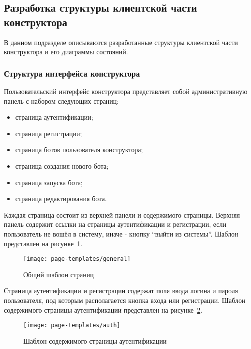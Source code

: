 \subsection{Разработка структуры клиентской части конструктора}


В данном подразделе описываются разработанные структуры клиентской части
конструктора и его диаграммы состояний.

\subsubsection{Структура интерфейса конструктора}

Пользовательский интерфейс конструктора представляет собой
административную панель с набором следующих страниц:

\begin{itemize}
	\item страница аутентификации;
	\item страница регистрации;
	\item страница ботов пользователя конструктора;
	\item страница создания нового бота;
	\item страница запуска бота;
	\item страница редактирования бота.
\end{itemize}


Каждая страница состоит из верхней панели и содержимого страницы.
Верхняя панель содержит ссылки на страницы аутентификации и регистрации,
если пользователь не вошёл в систему, иначе - кнопку “выйти из системы”.
Шаблон представлен на рисунке~\ref{f:general-template}.

\begin{figure}[!ht]
	\centering
	\vspace{\toppaddingoffigure}
	\texttt{[image: page-templates/general]}
	\caption{Общий шаблон страниц}
	\label{f:general-template}
\end{figure}


Страница аутентификации и регистрации содержат поля ввода логина и
пароля пользователя, под которым располагается кнопка входа или
регистрации. Шаблон содержимого страницы аутентификации представлен на
рисунке~\ref{f:auth-template}.

\begin{figure}[!ht]
	\centering
	\texttt{[image: page-templates/auth]}
	\caption{Шаблон содержимого страницы аутентификации}
	\label{f:auth-template}
\end{figure}


